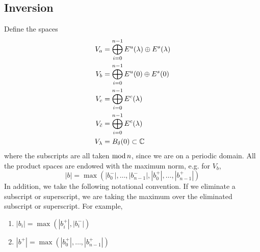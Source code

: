 \documentclass[thesis.tex]{subfiles}
\begin{document}
\subsection{Inversion}

Define the spaces
\begin{align*}
V_a &= \bigoplus_{i=0}^{n-1} E^u(\lambda) \oplus E^s(\lambda) \\
V_b &= \bigoplus_{i=0}^{n-1} E^u(0) \oplus E^s(0) \\
V_c &= \bigoplus_{i=0}^{n-1} E^c(\lambda) \\
V_{\tilde{c}} &= \bigoplus_{i=0}^{n-1} E^c(\lambda) \\
V_\lambda &= B_\delta(0) \subset \mathbb{C}
\end{align*}
where the subscripts are all taken $\mathop\mathrm{mod}\nolimits n$, since we are on a periodic domain. All the product spaces are endowed with the maximum norm, e.g. for $V_b$, 
\[
|b| = \max(|b_0^-|, \dots, |b_{n-1}^-|, |b_0^+|, \dots, |b_{n-1}^+|)
\]
In addition, we take the following notational convention. If we eliminate a subscript or superscript, we are taking the maximum over the eliminated subscript or superscript. For example,
\begin{enumerate}
	\item $|b_i| = \max(|b_i^+|, |b_i^-|)$ 
	\item $|b^+| = \max(|b_0^+|, \dots, |b_{n-1}^+|)$
\end{enumerate}
\end{document}

